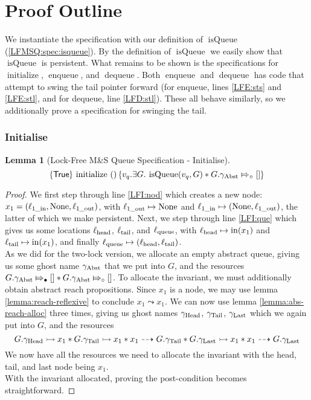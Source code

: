 \documentclass[a4paper, 10pt]{report}
\theoremstyle{definition}
\newtheorem{lemma}[theorem]{Lemma}
\newcommand{\initialise}{\operatorname{initialize}}
\newcommand{\enqueue}{\operatorname{enqueue}}
\newcommand{\dequeue}{\operatorname{dequeue}}
\newcommand{\msq}{M\&S Queue}
\newcommand{\lfmsq}{Lock-Free \msq{}}
\newcommand{\isqueue}{\operatorname{isQueue}}
\newcommand{\vq}{v_q}
\newcommand{\locinM}[1]{\loc_{#1\_\mathrm{in}}}
\newcommand{\locoutM}[1]{\loc_{#1\_\mathrm{out}}}
\newcommand{\locN}[1]{\loc_{\mathrm{#1}}}
\newcommand{\lochead}{\locN{head}}
\newcommand{\loctail}{\locN{tail}}
\newcommand{\locqueue}{\locN{queue}}
\newcommand{\nIn}[1]{\operatorname{in}(#1)}
\newcommand{\node}{x}
\newcommand{\nodeM}[1]{\node_{#1}}
\newcommand{\Qg}{G}
\newcommand{\gabst}{\gname_{\mathrm{Abst}}}
\newcommand{\ghead}{\gname_{\mathrm{Head}}}
\newcommand{\gtail}{\gname_{\mathrm{Tail}}}
\newcommand{\glast}{\gname_{\mathrm{Last}}}
\newcommand{\abstractstatefullfrag}[2]{#1 \Mapsto_{\circ} #2}
\newcommand{\abstractstateauth}[2]{#1 \Mapsto_{\bullet} #2}
\newcommand{\reach}[2]{#1 \leadsto #2}
\newcommand{\ar}[2]{#1 \dashrightarrow #2}
\newcommand{\ap}[2]{#1 \rightarrowtail #2}
\newcommand{\tlhocapspecinitHTGen}[2]{\hoare{\TRUE}{\initialise \ \TT}{#1 . \Exists #2 . \isqueue(#1, #2) \star{} \abstractstatefullfrag{#2.\gabst}{[]}}}
\newcommand{\tlhocapspecinitGen}[2]{\tlhocapspecinitHTGen{#1}{#2}}
\newcommand{\tlhocapspecinit}{\tlhocapspecinitGen{\vq}{\Qg}}
\newcommand{\lfhocapspecinit}{\tlhocapspecinit}
\begin{document}
\section{Proof Outline}
\label{LFMSQ:section:proof-outline}

We instantiate the specification with our definition of $\isqueue$ (\ref{LFMSQ:spec:isqueue}). By the definition of $\isqueue$ we easily show that $\isqueue$ is persistent. What remains to be shown is the specifications for $\initialise$, $\enqueue$, and $\dequeue$. Both $\enqueue$ and $\dequeue$ has code that attempt to swing the tail pointer forward (for enqueue, lines \ref{LFE:sts} and \ref{LFE:stl}, and for dequeue, line \ref{LFD:stl}). These all behave similarly, so we additionally prove a specification for swinging the tail.

\subsubsection{Initialise}
\begin{lemma}[\lfmsq{} Specification - Initialise]\label{LFMSQ:spec:init}
  \begin{equation*}
    \lfhocapspecinit
  \end{equation*}
\end{lemma}
\begin{proof}
We first step through line \ref{LFI:nod} which creates a new node: $\nodeM{1} = (\locinM{1}, \None, \locoutM{1})$, with $\locoutM{1} \mapsto \None$ and $\locinM{1} \mapsto (\None, \locoutM{1})$, the latter of which we make persistent. Next, we step through line \ref{LFI:que} which gives us some locations $\lochead$, $\loctail$, and $\locqueue$, with $\lochead \mapsto \nIn{\nodeM{1}}$ and $\loctail \mapsto \nIn{\nodeM{1}}$, and finally $\locqueue \mapsto (\lochead, \loctail)$.\\
As we did for the two-lock version, we allocate an empty abstract queue, giving us some ghost name $\gabst$ that we put into $\Qg$, and the resources $\abstractstateauth{\Qg.\gabst}{[]} \star{} \abstractstatefullfrag{\Qg.\gabst}{[]}$. To allocate the invariant, we must additionally obtain abstract reach propositions. Since $\nodeM{1}$ is a node, we may use lemma \ref{lemma:reach-reflexive} to conclude $\reach{\nodeM{1}}{\nodeM{1}}$. We can now use lemma \ref{lemma:abs-reach-alloc} three times, giving us ghost names $\ghead$, $\gtail$, $\glast$ which we again put into $\Qg$, and the resources
\begin{equation*}
  \ap{\Qg.\ghead}{\nodeM{1}} \star{} \ap{\Qg.\gtail}{\nodeM{1}} \star{} \ar{\nodeM{1}}{\Qg.\gtail} \star{} \ap{\Qg.\glast}{\nodeM{1}} \star{} \ar{\nodeM{1}}{\Qg.\glast}
\end{equation*}
We now have all the resources we need to allocate the invariant with the head, tail, and last node being $\nodeM{1}$.\\
With the invariant allocated, proving the post-condition becomes straightforward.
\end{proof}
\end{document}
